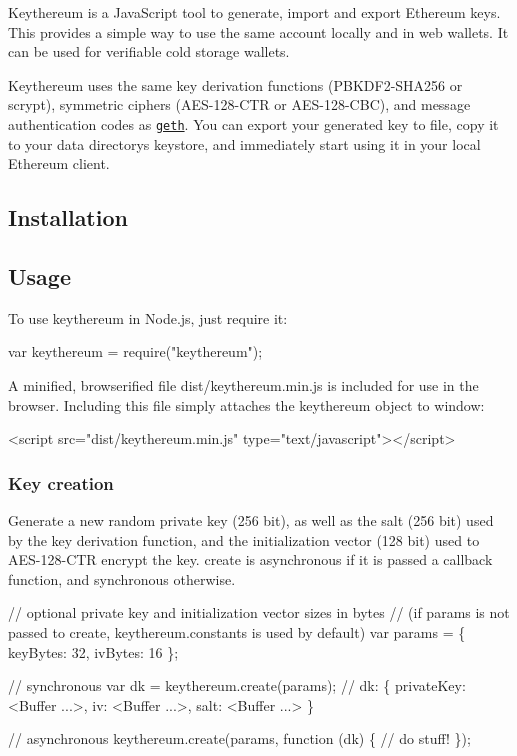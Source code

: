 \href{https://travis-ci.org/ethereumjs/keythereum}{\tt } \href{https://coveralls.io/github/ethereumjs/keythereum?branch=master}{\tt } \href{http://badge.fury.io/js/keythereum}{\tt }

Keythereum is a Java\+Script tool to generate, import and export Ethereum keys. This provides a simple way to use the same account locally and in web wallets. It can be used for verifiable cold storage wallets.

Keythereum uses the same key derivation functions (P\+B\+K\+D\+F2-\/\+S\+H\+A256 or scrypt), symmetric ciphers (A\+E\+S-\/128-\/\+C\+TR or A\+E\+S-\/128-\/\+C\+BC), and message authentication codes as \href{https://github.com/ethereum/go-ethereum}{\tt geth}. You can export your generated key to file, copy it to your data directory\textquotesingle{}s keystore, and immediately start using it in your local Ethereum client.

\subsection*{Installation }



\subsection*{Usage }

To use keythereum in Node.\+js, just {\ttfamily require} it\+: 
\begin{DoxyCode}
var keythereum = require("keythereum");
\end{DoxyCode}
 A minified, browserified file {\ttfamily dist/keythereum.\+min.\+js} is included for use in the browser. Including this file simply attaches the {\ttfamily keythereum} object to {\ttfamily window}\+: 
\begin{DoxyCode}
<script src="dist/keythereum.min.js" type="text/javascript"></script>
\end{DoxyCode}


\subsubsection*{Key creation}

Generate a new random private key (256 bit), as well as the salt (256 bit) used by the key derivation function, and the initialization vector (128 bit) used to A\+E\+S-\/128-\/\+C\+TR encrypt the key. {\ttfamily create} is asynchronous if it is passed a callback function, and synchronous otherwise. 
\begin{DoxyCode}
// optional private key and initialization vector sizes in bytes
// (if params is not passed to create, keythereum.constants is used by default)
var params = \{ keyBytes: 32, ivBytes: 16 \};

// synchronous
var dk = keythereum.create(params);
// dk:
\{
    privateKey: <Buffer ...>,
    iv: <Buffer ...>,
    salt: <Buffer ...>
\}

// asynchronous
keythereum.create(params, function (dk) \{
    // do stuff!
\});
\end{DoxyCode}


